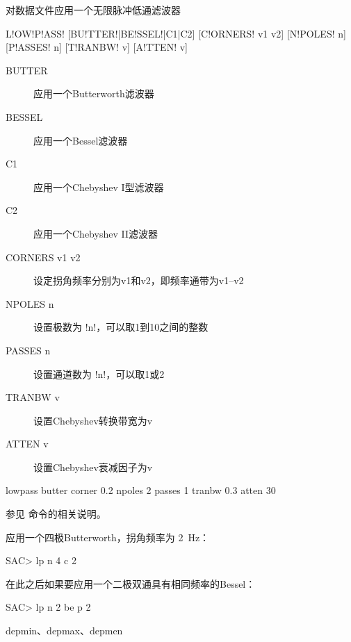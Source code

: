 \label{cmd:lowpass}

对数据文件应用一个无限脉冲低通滤波器

\begin{SACSTX}
L!OW!P!ASS! [BU!TTER!|BE!SSEL!|C1|C2] [C!ORNERS! v1 v2] [N!POLES! n] [P!ASSES! n]
    [T!RANBW! v] [A!TTEN! v]
\end{SACSTX}

\begin{description}
\item [BUTTER] 应用一个Butterworth滤波器
\item [BESSEL] 应用一个Bessel滤波器
\item [C1] 应用一个Chebyshev I型滤波器
\item [C2] 应用一个Chebyshev II滤波器
\item [CORNERS v1 v2] 设定拐角频率分别为v1和v2，即频率通带为v1--v2
\item [NPOLES n] 设置极数为 !n!，可以取1到10之间的整数
\item [PASSES n] 设置通道数为 !n!，可以取1或2
\item [TRANBW v] 设置Chebyshev转换带宽为v
\item [ATTEN v] 设置Chebyshev衰减因子为v
\end{description}

\begin{SACDFT}
lowpass butter corner 0.2 npoles 2 passes 1 tranbw 0.3 atten 30
\end{SACDFT}

参见  命令的相关说明。

应用一个四极Butterworth，拐角频率为 \SI{2}{\Hz}：
\begin{SACCode}
SAC> lp n 4 c 2
\end{SACCode}

在此之后如果要应用一个二极双通具有相同频率的Bessel：
\begin{SACCode}
SAC> lp n 2 be p 2
\end{SACCode}

depmin、depmax、depmen
